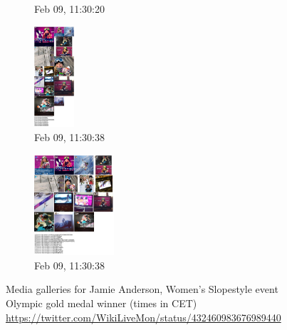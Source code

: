 \documentclass{sig-alternate}
\newcommand{\inlinelistingsize}{\fontsize{8pt}{11pt}}
\let\oldurl\url
\renewcommand{\url}[1]{\inlinelistingsize\oldurl{#1}}
\begin{document}
\begin{figure}
\begin{subfigure}[t]{0.25\textwidth}
    \caption{Feb 09, 11:30:20}
    \label{fig:1391941820162}
  \end{subfigure}
  \begin{subfigure}[t]{0.25\textwidth}
    \includegraphics[height=3.75cm]{figures/jamie_anderson/mediagallery_looseOrder_1391941838760.png}
    \caption{Feb 09, 11:30:38}
    \label{fig:1391941838760}
  \end{subfigure}%
  \begin{subfigure}[t]{0.25\textwidth}
    \includegraphics[height=3.75cm]{figures/jamie_anderson/mediagallery_strictOrder_1391941838444.png}
    \caption{Feb 09, 11:30:38}
    \label{fig:1391941838444}
  \end{subfigure}  
  \caption{Media galleries for Jamie Anderson,
    Women's Slopestyle event Olympic gold medal winner (times in CET)
    \url{https://twitter.com/WikiLiveMon/status/432460983676989440}}
  \label{fig:jamie-anderson}
\end{figure}
\end{document}
